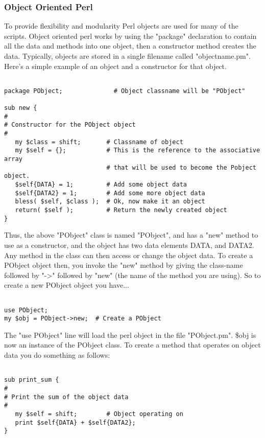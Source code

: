 \documentclass[]{article}
\begin{document}
\subsubsection{Object Oriented Perl}
To provide flexibility and modularity Perl objects are used for many of the scripts.
Object oriented perl works by using the "package" declaration to contain all the data
and methods into one object, then a constructor method creates the data. Typically, objects
are stored in a single filename called "objectname.pm". Here's a simple example of an
object and a constructor for that object.

\begin{ttfamily}
\begin{verbatim}

package PObject;              # Object classname will be "PObject"

sub new {
#
# Constructor for the PObject object
#
   my $class = shift;       # Classname of object
   my $self = {};           # This is the reference to the associative array 
                            # that will be used to become the Pobject object.
   $self{DATA} = 1;         # Add some object data
   $self{DATA2} = 1;        # Add some more object data
   bless( $self, $class );  # Ok, now make it an object
   return( $self );         # Return the newly created object
}

\end{verbatim}
\end{ttfamily}
Thus, the above "PObject" class is named "PObject", and has a "new" method to use as a constructor,
and the object has two data elements DATA, and DATA2. Any method in the class can then access or
change the object data. 
To create a PObject object then, you invoke the "new" method by giving the class-name followed
by "->" followed by "new" (the name of the method you are using). So to create a new PObject object
you have...
\begin{ttfamily}
\begin{verbatim}

use PObject;
my $obj = PObject->new;  # Create a PObject

\end{verbatim}
\end{ttfamily}
The "use PObject" line will load the perl object in the file "PObject.pm". \$obj is now an
instance of the PObject class. To create a method that operates on object data you do something
as follows:
\begin{ttfamily}
\begin{verbatim}

sub print_sum {
#
# Print the sum of the object data
#
   my $self = shift;        # Object operating on
   print $self{DATA} + $self{DATA2};
}

\end{verbatim}
\end{ttfamily}
\end{document}
